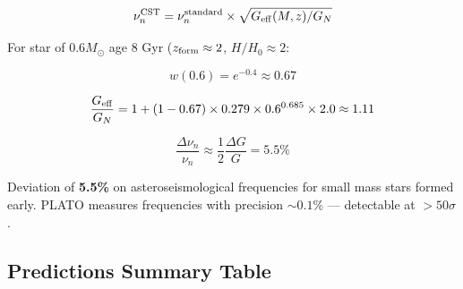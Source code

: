 \documentclass[11pt,a4paper]{article}
\begin{document}
\[\nu_n^{\rm CST} = \nu_n^{\rm standard} \times \sqrt{G_{\rm eff}(M,z)/G_N}\]

For star of \(0.6 M_\odot\) age 8 Gyr (\(z_{\rm form} \approx 2\),
\(H/H_0 \approx 2\):

\[w(0.6) = e^{-0.4} \approx 0.67\]

\[\frac{G_{\rm eff}}{G_N} = 1 + (1-0.67) \times 0.279 \times 0.6^{0.685} \times 2.0 \approx 1.11\]

\[\frac{\Delta\nu_n}{\nu_n} \approx \frac{1}{2}\frac{\Delta G}{G} = 5.5\%\]

Deviation of \textbf{5.5\%} on asteroseismological frequencies for small
mass stars formed early. PLATO measures frequencies with precision
\(\sim 0.1\%\) --- detectable at \(> 50\sigma\).

\hypertarget{predictions-summary-table}{%
\subsection{Predictions Summary
Table}\label{predictions-summary-table}}
\end{document}
